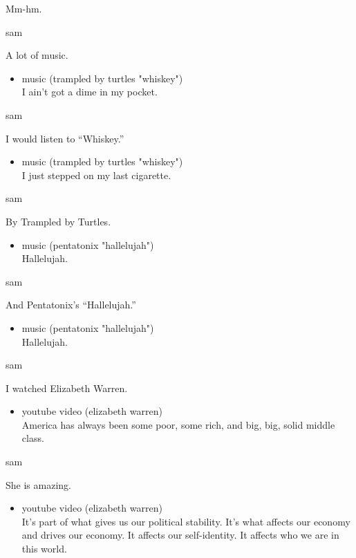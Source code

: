 Mm-hm.

sam

A lot of music.

\begin{itemize}
\tightlist
\item
  music (trampled by turtles "whiskey")\\
  I ain't got a dime in my pocket.
\end{itemize}

sam

I would listen to ``Whiskey.''

\begin{itemize}
\tightlist
\item
  music (trampled by turtles "whiskey")\\
  I just stepped on my last cigarette.
\end{itemize}

sam

By Trampled by Turtles.

\begin{itemize}
\tightlist
\item
  music (pentatonix "hallelujah")\\
  Hallelujah.
\end{itemize}

sam

And Pentatonix's ``Hallelujah.''

\begin{itemize}
\tightlist
\item
  music (pentatonix "hallelujah")\\
  Hallelujah.
\end{itemize}

sam

I watched Elizabeth Warren.

\begin{itemize}
\tightlist
\item
  youtube video (elizabeth warren)\\
  America has always been some poor, some rich, and big, big, solid
  middle class.
\end{itemize}

sam

She is amazing.

\begin{itemize}
\tightlist
\item
  youtube video (elizabeth warren)\\
  It's part of what gives us our political stability. It's what affects
  our economy and drives our economy. It affects our self-identity. It
  affects who we are in this world.
\end{itemize}

